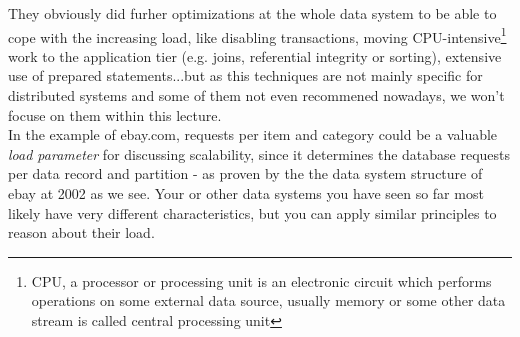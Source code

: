 They obviously did furher optimizations at the whole data system to be able to cope with the increasing load, like disabling transactions, moving CPU-intensive\footnote{CPU, a processor or processing unit is an electronic circuit which performs operations on some external data source, usually memory or some other data stream is called central processing unit} work to the application tier (e.g. joins, referential integrity or sorting), extensive use of prepared statements...but as this techniques are not mainly specific for distributed systems and some of them not even recommened nowadays, we won't focuse on them within this lecture.\\

In the example of ebay.com, requests per item and category could be a valuable \textit{load parameter} for discussing scalability, since it determines the database requests per data record and partition - as proven by the the data system structure of ebay at 2002 as we see.
Your or other data systems you have seen so far most likely have very different characteristics, but you can apply similar principles to reason about their load.
\\[0.5 cm]
\hspace*{4mm}%
\hspace*{4mm}%

